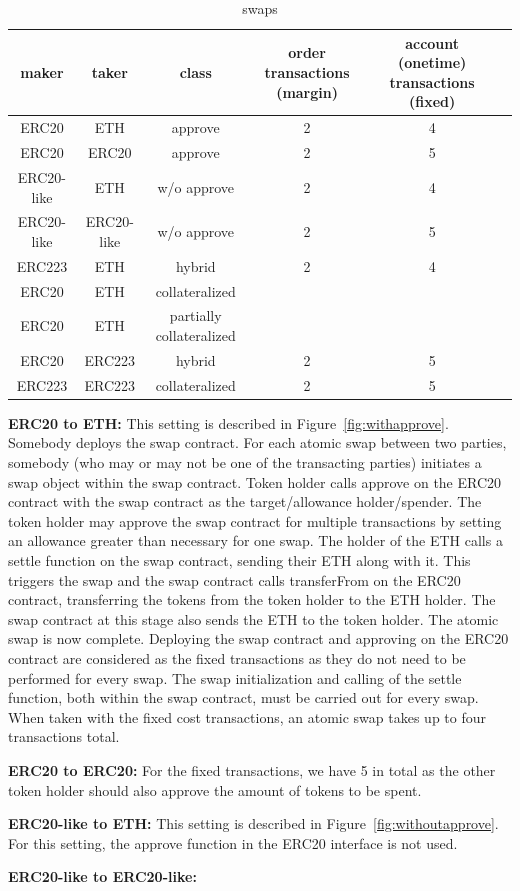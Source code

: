 \begin{table}[h!]
\footnotesize
\centering
\begin{tabular}{ |c|c|c|c|c|c| }
  \hline
   maker & taker & class & order transactions (margin) & account (onetime) transactions (fixed) \\ \hline
   ERC20 & ETH & approve & 2 & 4 \\ \hline
   ERC20 & ERC20 & approve & 2 & 5 \\ \hline
   ERC20-like & ETH & w/o approve & 2 & 4 \\ \hline
   ERC20-like & ERC20-like & w/o approve & 2 & 5 \\ \hline
   ERC223 & ETH & hybrid & 2 & 4\\ \hline
   ERC20 & ETH & collateralized & &\\ \hline
   ERC20 & ETH & partially collateralized & &\\ \hline
   ERC20 & ERC223 & hybrid & 2 & 5 \\ \hline
   ERC223 & ERC223 & collateralized & 2 & 5\\ \hline
\end{tabular}
\caption {swaps}
\end{table}\label{Table:Comparison of different swaps} 
\textbf{ERC20 to ETH:} This setting is described in Figure~\ref{fig:withapprove}. Somebody deploys the swap contract. For each atomic swap between two parties, somebody (who may or may not be one of the transacting parties) initiates a swap object within the swap contract. Token holder calls approve on the ERC20 contract with the swap contract as the target/allowance holder/spender. The token holder may approve the swap contract for multiple transactions by setting an allowance greater than necessary for one swap. The holder of the ETH calls a settle function on the swap contract, sending their ETH along with it. This triggers the swap and the swap contract calls transferFrom on the ERC20 contract, transferring the tokens from the token holder to the ETH holder. The swap contract at this stage also sends the ETH to the token holder. The atomic swap is now complete. Deploying the swap contract and approving on the ERC20 contract are considered as the fixed transactions as they do not need to be performed for every swap. The swap initialization and calling of the settle function, both within the swap contract, must be carried out for every swap. When taken with the fixed cost transactions, an atomic swap takes up to four transactions total.

\textbf{ERC20 to ERC20:} For the fixed transactions, we have 5 in total as the other token holder should also approve the amount of tokens to be spent.

\textbf{ERC20-like to ETH:} This setting is described in Figure~\ref{fig:withoutapprove}. For this setting, the approve function in the ERC20 interface is not used.

\textbf{ERC20-like to ERC20-like:}